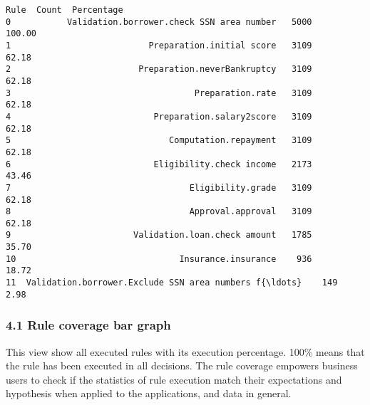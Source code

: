 \documentclass[11pt]{article}
\makeatletter
\newcommand{\boxspacing}{\kern\kvtcb@left@rule\kern\kvtcb@boxsep}
\newcommand{\prompt}[4]{
        {\ttfamily\llap{{\color{#2}[#3]:\hspace{3pt}#4}}\vspace{-\baselineskip}}
    }
\makeatother
\begin{document}
            \begin{tcolorbox}[breakable, size=fbox, boxrule=.5pt, pad at break*=1mm, opacityfill=0]
\prompt{Out}{outcolor}{15}{\boxspacing}
\begin{Verbatim}[commandchars=\\\{\}]
                                                 Rule  Count  Percentage
0           Validation.borrower.check SSN area number   5000      100.00
1                           Preparation.initial score   3109       62.18
2                         Preparation.neverBankruptcy   3109       62.18
3                                    Preparation.rate   3109       62.18
4                            Preparation.salary2score   3109       62.18
5                               Computation.repayment   3109       62.18
6                            Eligibility.check income   2173       43.46
7                                   Eligibility.grade   3109       62.18
8                                   Approval.approval   3109       62.18
9                        Validation.loan.check amount   1785       35.70
10                                Insurance.insurance    936       18.72
11  Validation.borrower.Exclude SSN area numbers f{\ldots}    149        2.98
\end{Verbatim}
\end{tcolorbox}
        
    \hypertarget{rule-coverage-bar-graph}{%
\subsubsection{4.1 Rule coverage bar
graph}\label{rule-coverage-bar-graph}}

This view show all executed rules with its execution percentage. 100\%
means that the rule has been executed in all decisions. The rule
coverage empowers business users to check if the statistics of rule
execution match their expectations and hypothesis when applied to the
applications, and data in general.
\end{document}
